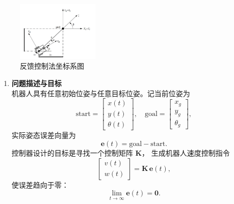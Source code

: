 \documentclass[../main.tex]{subfiles}
\begin{document}
\begin{enumerate}
\begin{itemize}
                            \begin{figure}[H]
                                \centering
                                \includegraphics[width=0.35\textwidth]{images/feedbackcon.png}
                                \caption{反馈控制法坐标系图}
                            \end{figure} 
                            {\small\kaishu
                            \begin{enumerate}
                                \item \textbf{问题描述与目标}\\
                                机器人具有任意初始位姿与任意目标位姿。记当前位姿为
                                \[
                                \text{start} = 
                                \begin{bmatrix}
                                    x(t) \\ y(t) \\ \theta(t)
                                \end{bmatrix},
                                \quad
                                \text{goal} =
                                \begin{bmatrix}
                                    x_g \\ y_g \\ \theta_g
                                \end{bmatrix},
                                \]
                                实际姿态误差向量为
                                \[
                                \mathbf{e}(t) = \text{goal} - \text{start}.
                                \]
                                控制器设计的目标是寻找一个控制矩阵 $\mathbf{K}$，
                                生成机器人速度控制指令
                                \[
                                \begin{bmatrix}
                                    v(t) \\[2pt]
                                    w(t)
                                \end{bmatrix}
                                = \mathbf{K}\,\mathbf{e}(t),
                                \]
                                使误差趋向于零：
                                \[
                                \lim_{t \to \infty} \mathbf{e}(t) = \mathbf{0}.
                                \]
                            

\end{enumerate}}
\end{itemize}
\end{enumerate}
\end{document}

